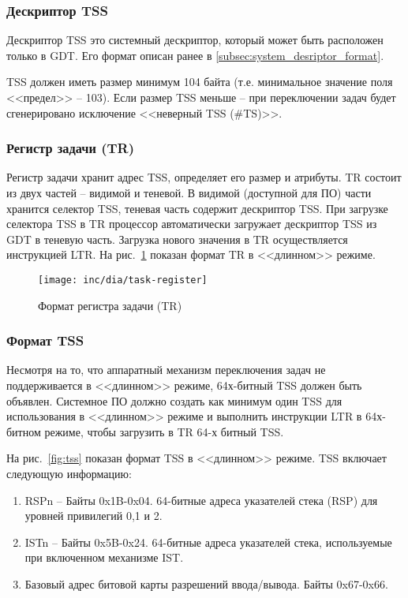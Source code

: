 \subsubsection*{Дескриптор TSS}
Дескриптор TSS это системный дескриптор, который может быть расположен только
в GDT. Его формат описан ранее в \ref{subsec:system_desriptor_format}.

TSS должен иметь размер минимум 104 байта (т.е. минимальное значение поля <<предел>> -- 103).
Если размер TSS меньше -- при переключении задач будет сгенерировано
исключение <<неверный TSS (\#TS)>>.

\subsubsection*{Регистр задачи (TR)}
Регистр задачи хранит адрес TSS, определяет его размер и атрибуты. TR состоит
из двух частей -- видимой и теневой. В видимой (доступной для ПО) части хранится селектор TSS,
теневая часть содержит дескриптор TSS. При загрузке селектора TSS в TR
процессор автоматически загружает дескриптор TSS из GDT в теневую часть.
Загрузка нового значения в TR осуществляется инструкцией LTR. На
рис.~\ref{fig:task_register} показан формат TR в <<длинном>> режиме.

\begin{figure}
  \centering
  \texttt{[image: inc/dia/task-register]}
  \caption{Формат регистра задачи (TR)}
  \label{fig:task_register}
\end{figure}

\subsubsection*{Формат TSS}
Несмотря на то, что аппаратный механизм переключения задач не поддерживается в
<<длинном>> режиме, 64х-битный TSS должен быть объявлен. Системное ПО должно
создать как минимум один TSS для использования в <<длинном>> режиме и
выполнить инструкции LTR в 64х-битном режиме, чтобы загрузить в TR 64-х битный
TSS.

На рис.~\ref{fig:tss} показан формат TSS в <<длинном>> режиме. TSS включает
следующую информацию:
\begin{enumerate}
\item RSPn -- Байты 0x1B-0x04. 64-битные адреса указателей стека (RSP) для
	уровней привилегий 0,1 и 2.
\item ISTn -- Байты 0x5B-0x24. 64-битные адреса указателей стека, используемые
	при включенном механизме IST.
\item Базовый адрес битовой карты разрешений ввода/вывода. Байты 0x67-0x66.
\end{enumerate}

